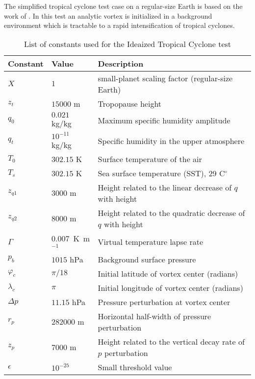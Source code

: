 \documentclass[times,doublespace]{fldauth}
\begin{document}
The simplified tropical cyclone test case on a regular-size Earth is based on the work of \cite{reed2012idealized, reed2011analytic,reed2011impact, reed2011assessing}.  In this test an analytic vortex is initialized in a background environment which is tractable to a rapid intensification of tropical cyclones.  

\begin{table}[h]

\caption{List of constants used for the Ideaized Tropical Cyclone test}

\begin{tabular*}{\textwidth}{@{\extracolsep{\fill}}lll}
\hline Constant & Value & Description \\
\hline
$X$ & $1$ & small-planet scaling factor (regular-size Earth)\\
$z_t$ & $15000$ m & Tropopause height \\
$q_0$ & $0.021$ kg/kg & Maximum specific humidity amplitude \\
$q_t$ & $10^{-11}$ kg/kg & Specific humidity in the upper atmosphere \\
$T_0$ & $302.15$ K & Surface temperature of the air \\
$T_s$ & $302.15$ K & Sea surface temperature (SST), 29 C$^\circ$\\
$z_{q1}$ & $3000$ m & Height related to the linear decrease of $q$ with height \\
$z_{q2}$ & $8000$ m & Height related to the quadratic decrease of $q$ with height \\
$\Gamma$ & $0.007$\ K\ m$^{-1}$ & Virtual temperature lapse rate \\
$p_{b}$ & $1015$ hPa & Background surface pressure \\
$\varphi_c$ & $\pi / 18$ & Initial latitude of vortex center (radians) \\
$\lambda_c$ & $\pi$ & Initial longitude of vortex center (radians) \\
$\Delta p$ & $11.15$ hPa & Pressure perturbation at vortex center \\
$r_p$ & $282000$ m & Horizontal half-width of pressure perturbation \\
$z_p$ & $7000$ m & Height related to the vertical decay rate of $p$ perturbation \\
$\epsilon$ & $10^{-25}$ & Small threshold value \\
\hline 
\end{tabular*}

\end{table}
\end{document}
